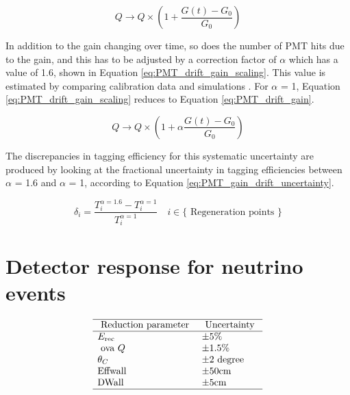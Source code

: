 \begin{equation}
    Q \longrightarrow Q \times\left(1+\frac{G(t)-G_0}{G_0}\right)
\label{eq:PMT_drift_gain}
\end{equation}

In addition to the gain changing over time, so does the number of PMT hits due to the gain, and this has to be adjusted by a correction factor of $\alpha$ which has a value of 1.6, shown in Equation \ref{eq:PMT_drift_gain_scaling}. This value is estimated by comparing calibration data and simulations \cite{linyan_thesis}. For $\alpha$ = 1, Equation \ref{eq:PMT_drift_gain_scaling} reduces to Equation \ref{eq:PMT_drift_gain}.


\begin{equation}
    Q \longrightarrow Q \times\left(1+\alpha\frac{G(t)-G_0}{G_0}\right)
\label{eq:PMT_drift_gain_scaling}
\end{equation}

The discrepancies in tagging efficiency for this systematic uncertainty are produced by looking at the fractional uncertainty in tagging efficiencies between $\alpha$ = 1.6 and $\alpha$ = 1, according to Equation \ref{eq:PMT_gain_drift_uncertainty}.

\begin{equation}
    \delta_i=\frac{T_i^{\alpha=1.6}-T_i^{\alpha=1}}{T_i^{\alpha=1}} \quad i \in\{\text { Regeneration points }\}
\label{eq:PMT_gain_drift_uncertainty}
\end{equation}



\section{Detector response for neutrino events}
 
\begin{equation}
\begin{array}{ll}
\hline \text { Reduction parameter }  & \text { Uncertainty } \\
\hline E_{\text {rec }}  & \pm 5 \% \\
\text { ova } Q  & \pm 1.5 \% \\
\theta_C & \pm 2 \text { degree } \\
\text{Effwall} & \pm 50 \text {cm} \\
\text{DWall} & \pm 5 \text{cm}  \\

\hline
\end{array}
\end{equation}


